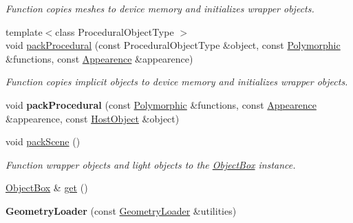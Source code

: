 \begin{DoxyCompactItemize}
\begin{DoxyCompactList}\small\item\em Function copies meshes to device memory and initializes wrapper objects. \end{DoxyCompactList}\item 
{\footnotesize template$<$class Procedural\+Object\+Type $>$ }\\void \hyperlink{class_geometry_loader_a175f8a4496b0b4d183f8eba7a2ac38f9}{pack\+Procedural} (const Procedural\+Object\+Type \&object, const \hyperlink{struct_polymorphic}{Polymorphic} \&functions, const \hyperlink{struct_appearence}{Appearence} \&appearence)
\begin{DoxyCompactList}\small\item\em Function copies implicit objects to device memory and initializes wrapper objects. \end{DoxyCompactList}\item 
void {\bfseries pack\+Procedural} (const \hyperlink{struct_polymorphic}{Polymorphic} \&functions, const \hyperlink{struct_appearence}{Appearence} \&appearence, const \hyperlink{class_host_object}{Host\+Object} \&object)\hypertarget{class_geometry_loader_a1d2eddd9fd6dfd98435ca4c2d618449e}{}\label{class_geometry_loader_a1d2eddd9fd6dfd98435ca4c2d618449e}

\item 
void \hyperlink{class_geometry_loader_a11a589427dc744b17ccc5085ec07a338}{pack\+Scene} ()\hypertarget{class_geometry_loader_a11a589427dc744b17ccc5085ec07a338}{}\label{class_geometry_loader_a11a589427dc744b17ccc5085ec07a338}

\begin{DoxyCompactList}\small\item\em Function wrapper objects and light objects to the \hyperlink{class_object_box}{Object\+Box} instance. \end{DoxyCompactList}\item 
\hyperlink{class_object_box}{Object\+Box} \& \hyperlink{class_geometry_loader_af3716f894c24e1662ffbbd48e0575bcd}{get} ()
\item 
{\bfseries Geometry\+Loader} (const \hyperlink{class_geometry_loader}{Geometry\+Loader} \&utilities)\hypertarget{class_geometry_loader_a9c9114a5b074611c21bed13b4a4e5020}{}\label{class_geometry_loader_a9c9114a5b074611c21bed13b4a4e5020}


\end{DoxyCompactItemize}
